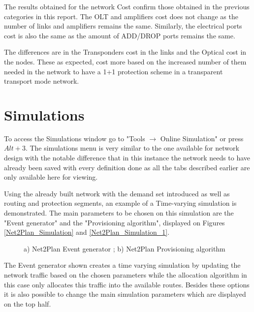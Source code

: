 \documentclass[12pt, a4paper]{article}
\begin{document}
		The results obtained for the network Cost confirm those obtained in the previous categories in this report. The OLT and amplifiers cost does not change as the number of links and amplifiers remains the same. Similarly, the electrical ports cost is also the same as the amount of ADD/DROP ports remains the same.
		
		The differences are in the Transponders cost in the links and the Optical cost in the nodes. These as expected, cost more based on the increased number of them needed in the network to have a 1+1 protection scheme in a transparent transport mode network.
		
	
	\newpage
	
	
	\section{Simulations}
	To access the Simulations window go to  "Tools $\rightarrow$ Online Simulation" or press $Alt + 3$. The simulations menu is very similar to the one available for network design with the notable difference that in this instance the network needs to have already been saved with every definition done as all the tabs described earlier are only available here for viewing.
	
	Using the already built network with the demand set introduced as well as routing and protection segments, an example of a Time-varying simulation is demonstrated. The main parameters to be chosen on this simulation are the "Event generator" and the "Provisioning algorithm", displayed on Figures \ref{Net2Plan_Simulation} and \ref{Net2Plan_Simulation_1}.
	
	\vspace{-0.3cm}
	
	\begin{figure}[!h]
		\centering
		\caption{a) Net2Plan Event generator ; b) Net2Plan Provisioning algorithm}
	\end{figure}	

	The Event generator shown creates a time varying simulation by updating the network traffic based on the chosen parameters while the allocation algorithm in this case only allocates this traffic into the available routes. Besides these options it is also possible to change the main simulation parameters which are displayed on the top half.
\end{document}
